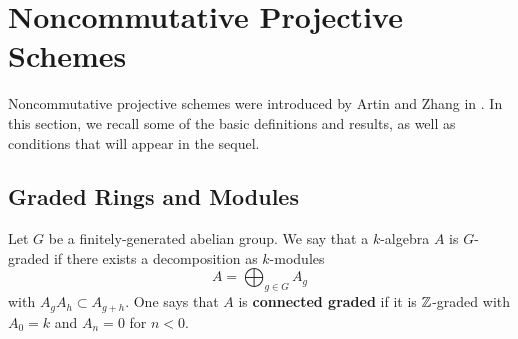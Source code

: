 \chapter{Noncommutative Projective Schemes}\label{chapter: background on NCP}

Noncommutative projective schemes were introduced by Artin and Zhang in \cite{AZ94}.
In this section, we recall some of the basic definitions and results, as well as conditions that will appear in the sequel.

\section{Graded Rings and Modules}
\begin{definition}
  Let \(G\) be a finitely-generated abelian group. We say that a \(k\)-algebra \(A\) is \(G\)-graded if there exists a decomposition as \(k\)-modules 
  \begin{displaymath}
    A = \bigoplus_{g \in G} A_g
  \end{displaymath}
  with \(A_g A_h \subset A_{g+h}\). One says that \(A\) is \textbf{connected graded} if it is \(\mathbb{Z}\)-graded with \(A_0 = k\) and \(A_n = 0\) for \(n < 0\). 
\end{definition}




